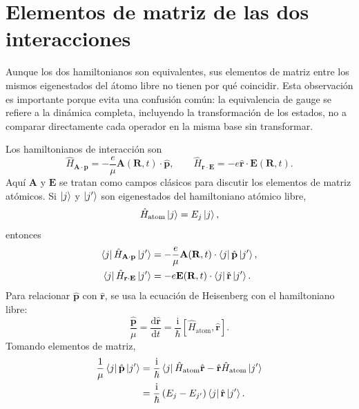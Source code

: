 \documentclass[11pt]{article}
\newcommand{\ii}{\mathrm{i}}
\newcommand{\dd}{\mathrm{d}}
\newcommand{\vb}[1]{\mathbf{#1}}
\begin{document}
\section{Elementos de matriz de las dos interacciones}

Aunque los dos hamiltonianos son equivalentes, sus elementos de matriz entre
los mismos eigenestados del \'atomo libre no tienen por qu\'e coincidir. Esta
observaci\'on es importante porque evita una confusi\'on com\'un: la equivalencia
de gauge se refiere a la din\'amica completa, incluyendo la transformaci\'on de
los estados, no a comparar directamente cada operador en la misma base sin
transformar.

Los hamiltonianos de interacci\'on son
\begin{equation}
  \hat H_{\vb A\cdot\vb p}
  =
  -\frac{e}{\mu}
  \vb A(\vb R,t)\cdot\hat{\vb p},
  \qquad
  \hat H_{\vb r\cdot\vb E}
  =
  -e\hat{\vb r}\cdot\vb E(\vb R,t).
\end{equation}
Aqu\'i \(\vb A\) y \(\vb E\) se tratan como campos cl\'asicos para discutir los
elementos de matriz at\'omicos. Si \(\ket j\) y \(\ket{j'}\) son eigenestados
del hamiltoniano at\'omico libre,
\begin{equation}
  \hat H_{\mathrm{atom}}\ket j
  =
  E_j\ket j,
\end{equation}
entonces
\begin{align}
  \bra j\hat H_{\vb A\cdot\vb p}\ket{j'}
  &=
  -\frac{e}{\mu}
  \vb A(\vb R,t)\cdot
  \bra j\hat{\vb p}\ket{j'},                                                   \\
  \bra j\hat H_{\vb r\cdot\vb E}\ket{j'}
  &=
  -e
  \vb E(\vb R,t)\cdot
  \bra j\hat{\vb r}\ket{j'}.
\end{align}
Para relacionar \(\hat{\vb p}\) con \(\hat{\vb r}\), se usa la ecuaci\'on de
Heisenberg con el hamiltoniano libre:
\begin{equation}
  \frac{\hat{\vb p}}{\mu}
  =
  \frac{\dd\hat{\vb r}}{\dd t}
  =
  \frac{\ii}{\hbar}
  \left[
    \hat H_{\mathrm{atom}},
    \hat{\vb r}
  \right].
\end{equation}
Tomando elementos de matriz,
\begin{align}
  \frac{1}{\mu}
  \bra j\hat{\vb p}\ket{j'}
  &=
  \frac{\ii}{\hbar}
  \bra j
  \hat H_{\mathrm{atom}}\hat{\vb r}
  -
  \hat{\vb r}\hat H_{\mathrm{atom}}
  \ket{j'}                                                                    \\
  &=
  \frac{\ii}{\hbar}
  \left(
    E_j-E_{j'}
  \right)
  \bra j\hat{\vb r}\ket{j'}.
\end{align}
\end{document}

